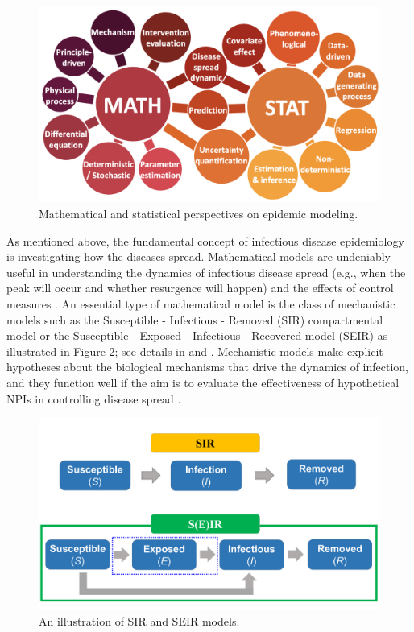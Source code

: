 \documentclass[]{book}
\begin{document}
\begin{figure}

{\centering \includegraphics[width=0.65\linewidth]{figures/model} 

}

\caption{Mathematical and statistical perspectives on epidemic modeling.}\label{fig:mathstat}
\end{figure}

As mentioned above, the fundamental concept of infectious disease
epidemiology is investigating how the diseases spread. Mathematical
models are undeniably useful in understanding the dynamics of infectious
disease spread (e.g., when the peak will occur and whether resurgence
will happen) and the effects of control measures
\citep{Keeling:Rohani:08}. An essential type of mathematical model is
the class of mechanistic models such as the Susceptible - Infectious -
Removed (SIR) compartmental model or the Susceptible - Exposed -
Infectious - Recovered model (SEIR) as illustrated in Figure
\ref{fig:SEIR}; see details in \citet{Brauer:etal:08} and
\citet{Lawson:etal:16}. Mechanistic models make explicit hypotheses
about the biological mechanisms that drive the dynamics of infection,
and they function well if the aim is to evaluate the effectiveness of
hypothetical NPIs in controlling disease spread
\citep{lessler2016mechanistic}.

\begin{figure}

{\centering \includegraphics[width=0.75\linewidth]{figures/SEIR1} 

}

\caption{An illustration of SIR and SEIR models.}\label{fig:SEIR}
\end{figure}
\end{document}
